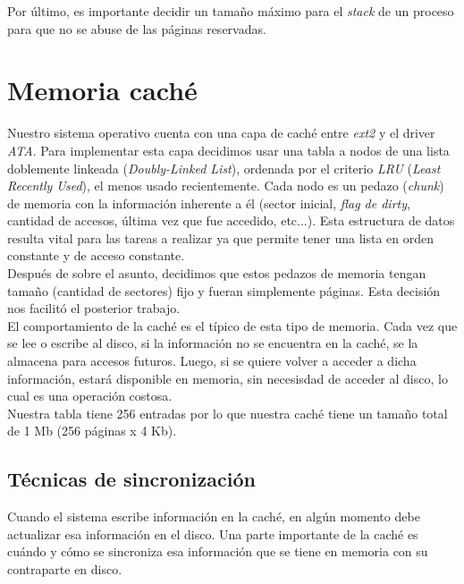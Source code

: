 \documentclass[a4paper,10pt]{article}
\begin{document}
Por último, es importante decidir un tamaño máximo para el \textit{stack} de un proceso para que no se abuse de las páginas 
reservadas.

\newpage

\section{Memoria caché}

Nuestro sistema operativo cuenta con una capa de caché entre \textit{ext2} y el driver \textit{ATA}. Para implementar esta capa decidimos usar una tabla 
a nodos de una lista doblemente linkeada (\textit{Doubly-Linked List}), ordenada por el criterio \textit{LRU} (\textit{Least Recently Used}), el menos usado
 recientemente. Cada nodo es un pedazo (\textit{chunk}) de memoria con la información inherente a él (sector inicial, \textit{flag de dirty}, 
cantidad de accesos, última vez que fue accedido, etc...). Esta estructura de datos resulta vital para las tareas a realizar ya que permite tener una lista
en orden constante y de acceso constante.\\

Después de sobre el asunto, decidimos que estos pedazos de memoria tengan tamaño (cantidad de sectores)
fijo y fueran simplemente páginas. Esta decisión nos facilitó el posterior trabajo.\\

El comportamiento de la caché es el típico de esta tipo de memoria. Cada vez que se lee o escribe al disco, si la información no se encuentra en la caché, se
 la almacena para accesos futuros. Luego, si se quiere volver a acceder a dicha información, estará disponible en memoria, sin necesisdad de acceder al disco, lo 
cual es una operación costosa.\\


Nuestra tabla tiene 256 entradas por lo que nuestra caché tiene un tamaño total de 1 Mb (256 páginas x 4 Kb).\\

        \subsection{Técnicas de sincronización}

        Cuando el sistema escribe información en la caché, en algún momento debe actualizar esa información en el disco. Una parte importante de la caché es cuándo y
        cómo se sincroniza esa información que se tiene en memoria con su contraparte en disco. \\
\end{document}
